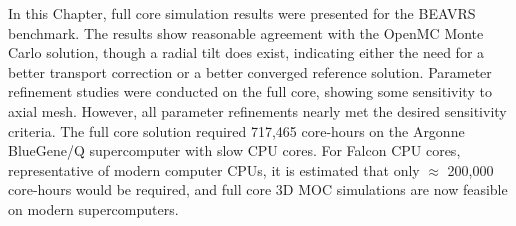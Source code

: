 In this Chapter, full core simulation results were presented for the BEAVRS benchmark. The results show reasonable agreement with the OpenMC Monte Carlo solution, though a radial tilt does exist, indicating either the need for a better transport correction or a better converged reference solution. Parameter refinement studies were conducted on the full core, showing some sensitivity to axial mesh. However, all parameter refinements nearly met the desired sensitivity criteria. The full core solution required 717,465 core-hours on the Argonne BlueGene/Q supercomputer with slow CPU cores. For Falcon CPU cores, representative of modern computer CPUs, it is estimated that only $\approx$ 200,000 core-hours would be required, and full core 3D \ac{MOC} simulations are now feasible on modern supercomputers.


  
  
  
